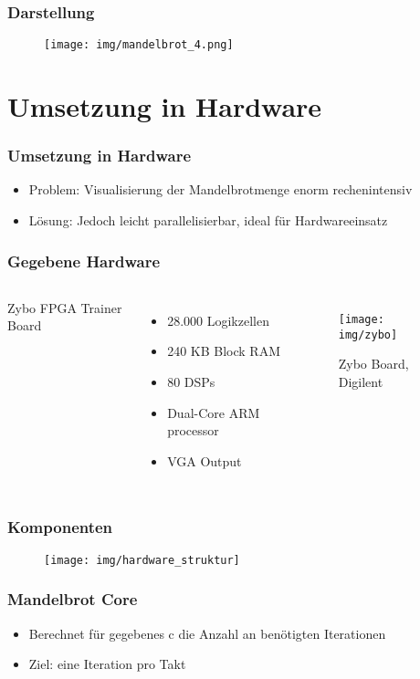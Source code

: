 \documentclass{beamer}
\begin{document}
\begin{frame}
    \frametitle{Darstellung}
    \begin{figure}
        \texttt{[image: img/mandelbrot\_4.png]}
    \end{figure}
\end{frame}

\section{Umsetzung in Hardware}
\begin{frame}
    \frametitle{Umsetzung in Hardware}
    \begin{itemize}
        \item Problem: Visualisierung der Mandelbrotmenge enorm rechenintensiv 
        \item Lösung: Jedoch leicht parallelisierbar, ideal für Hardwareeinsatz
    \end{itemize}
\end{frame}

\begin{frame}
    \frametitle{Gegebene Hardware}
    \begin{columns}[c]
        Zybo FPGA Trainer Board
        \begin{itemize}
            \item 28.000 Logikzellen
            \item 240 KB Block RAM
            \item 80 DSPs
            \item Dual-Core ARM processor
            \item VGA Output
        \end{itemize}

        \begin{figure}
            \texttt{[image: img/zybo]}
            \caption{Zybo Board, Digilent}
        \end{figure}
    \end{columns}
\end{frame}

\begin{frame}
    \frametitle{Komponenten}
    \begin{figure}
        \texttt{[image: img/hardware\_struktur]}
    \end{figure}
\end{frame}

\begin{frame}
    \frametitle{Mandelbrot Core}
    \begin{itemize}
        \item Berechnet für gegebenes c die Anzahl an benötigten Iterationen
        \item Ziel: eine Iteration pro Takt
    \end{itemize}
\end{frame}
\end{document}
